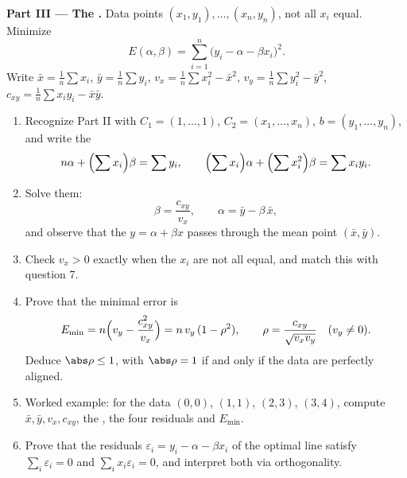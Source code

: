 \begin{problem}
\medskip
\noindent\textbf{Part III --- The .} Data points
$(x_1, y_1), \dots, (x_n, y_n)$, not all $x_i$ equal. Minimize
\[
E(\alpha, \beta) = \sum_{i=1}^{n}\bigl(y_i - \alpha - \beta
x_i\bigr)^2 .
\]
Write $\bar x = \frac1n\sum x_i$, $\bar y = \frac1n\sum y_i$,
$v_x = \frac1n\sum x_i^2 - \bar x^2$, $v_y = \frac1n\sum y_i^2 -
\bar y^2$, $c_{xy} = \frac1n\sum x_i y_i - \bar x\bar y$.
\begin{enumerate}[resume]
  \item Recognize Part II with $C_1 = (1, \dots, 1)$, $C_2 =
        (x_1, \dots, x_n)$, $b = (y_1, \dots, y_n)$, and write
        the 
        \[
        n\alpha + \Bigl(\sum x_i\Bigr)\beta = \sum y_i,
        \qquad
        \Bigl(\sum x_i\Bigr)\alpha + \Bigl(\sum
        x_i^2\Bigr)\beta = \sum x_i y_i .
        \]
  \item Solve them:
        \[
        \beta = \frac{c_{xy}}{v_x},
        \qquad
        \alpha = \bar y - \beta\,\bar x ,
        \]
        and observe that the \emph{} $y = \alpha
        + \beta x$ passes through the mean point $(\bar x, \bar
        y)$.
  \item Check $v_x > 0$ exactly when the $x_i$ are not all
        equal, and match this with question 7.
  \item Prove that the minimal error is
        \[
        E_{\min} = n\Bigl(v_y - \frac{c_{xy}^2}{v_x}\Bigr)
        = n\,v_y\,(1 - \rho^2),
        \qquad
        \rho = \frac{c_{xy}}{\sqrt{v_x v_y}}
        \quad (v_y \neq 0).
        \]
        Deduce $\abs\rho \leq 1$, with $\abs\rho = 1$ if and
        only if the data are perfectly aligned.
  \item Worked example: for the data $(0,0)$, $(1,1)$, $(2,3)$,
        $(3,4)$, compute $\bar x, \bar y, v_x, c_{xy}$, the
        , the four residuals and $E_{\min}$.
  \item Prove that the residuals $\varepsilon_i = y_i - \alpha -
        \beta x_i$ of the optimal line satisfy $\sum_i
        \varepsilon_i = 0$ and $\sum_i x_i\varepsilon_i = 0$,
        and interpret both via orthogonality.
\end{enumerate}


\end{problem}
